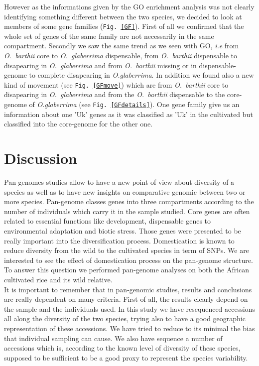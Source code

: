 \documentclass[10pt,letterpaper]{article}
\begin{document}
  However as the informations given by the GO enrichment analysis was not clearly identifying something different between the two species, we decided to look at members of some gene families (\texttt{Fig. \ref{GF}}).
  First of all we confirmed that the whole set of genes of the same family are not 
  necessarily in the same compartment. Secondly we saw the same trend as we seen with GO, \textit{i.e} from 
  \emph{O.~barthii} core to \emph{O.~glaberrima} dispensable, from \emph{O.~barthii} dispensable to disapearing in \emph{O.~glaberrima} and from \emph{O.~barthii} missing or in dispensable-genome to complete disapearing in \emph{O.glaberrima}. 
  In addition we found also a new kind of movement (see \texttt{Fig.~\ref{GFmove}}) which are from \emph{O.~barthii} core to disapearing in \emph{O.~glaberrima} and from the \emph{O.~barthii} dispensable to the 
  core-genome of \emph{O.glaberrima} (see \texttt{Fig.~\ref{GFdetails}}). 
  One gene family give us an information about one 'Uk' genes as it was classified as 'Uk' in the cultivated but classified into the core-genome for the other one.


\section*{Discussion}
Pan-genomes studies allow to have a new point of view about diversity of a species as well as to have new insights on comparative genomic between two or more species. Pan-genome classes genes into three compartments
according to the number of individuals which carry it in the sample studied. Core genes are often related to essential functions like development, dispensable genes to environmental adaptation and biotic stress. Those 
genes were presented to be really important into the diversification process. 
Domestication is known to reduce diversity from the wild to the cultivated species in term of SNPs. We are interested to see the effect of domestication process on the pan-genome structure. To answer this question we performed
pan-genome analyses on both the African cultivated rice and its wild relative.\\

It is important to remember that in pan-genomic studies, results and conclusions are really dependent on many criteria. First of all, the results clearly depend on the sample and the individuals used. In this study we have resequenced accessions all along the diversity of the two species, trying also to have a good geographic representation of these accessions. We have tried to reduce to its minimal the bias that individual sampling can cause. We also have sequence a number of accessions which is, according to the known level of diversity of these species, supposed to be sufficient to be a good proxy to represent the species variability.
\end{document}
